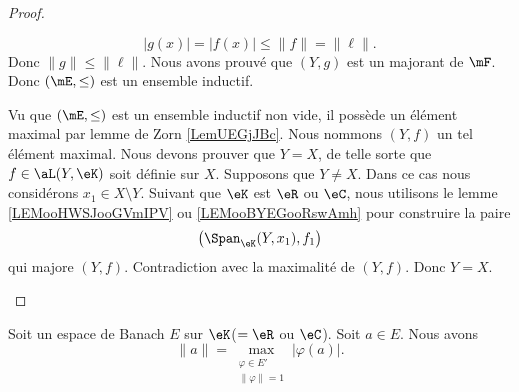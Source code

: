 \begin{proof}
\begin{subproof}
\begin{subproof}
\begin{equation}
                | g(x) |=| f(x) |\leq\| f \|=\| \ell \|.
            \end{equation}
            Donc \( \| g \|\leq \| \ell \|\).
            Nous avons prouvé que \( (Y,g)\) est un majorant de \( \mF\). Donc \( (\mE,\leq)\) est un ensemble inductif.
        \end{subproof}
        Vu que \( (\mE,\leq)\) est un ensemble inductif non vide, il possède un élément maximal par lemme de Zorn \ref{LemUEGjJBc}. Nous nommons \( (Y,f)\) un tel élément maximal.
        Nous devons prouver que \( Y=X\), de telle sorte que \( f\in\aL(Y,\eK)\) soit définie sur \( X\). Supposons que \( Y\neq X\). Dans ce cas nous considérons \( x_1\in X\setminus Y\). Suivant que \( \eK\) est \( \eR\) ou \( \eC\), nous utilisons le lemme \ref{LEMooHWSJooGVmIPV} ou \ref{LEMooBYEGooRswAmh} pour construire la paire
        \begin{equation}
            \big( \Span_{\eK}(Y,x_1),f_1 \big)
        \end{equation}
        qui majore \( (Y,f)\). Contradiction avec la maximalité de \( (Y,f)\). Donc \( Y=X\).
    \end{subproof}
\end{proof}

\begin{proposition}          \label{PROPooFJPXooWrjbuH}
    Soit un espace de Banach \( E\) sur \( \eK\)(\( =\eR\) ou \( \eC\)). Soit \( a\in E\). Nous avons
    \begin{equation}
        \| a \|=\max_{\substack{\varphi\in E'\\\| \varphi \|=1}}| \varphi(a) |.
    \end{equation}
\end{proposition}


